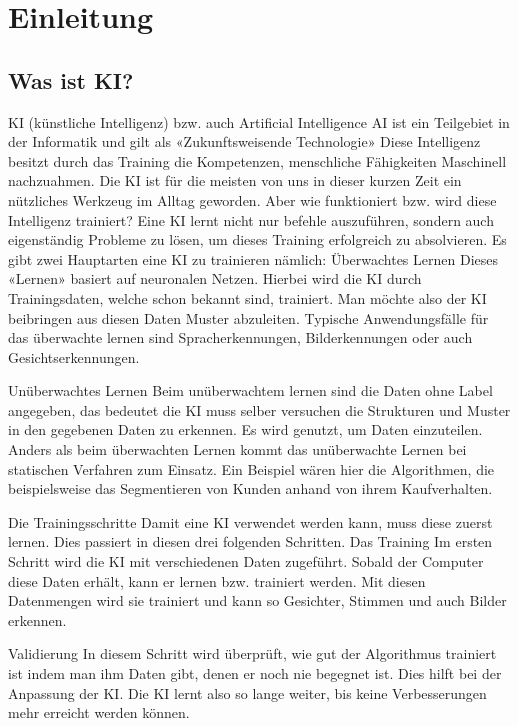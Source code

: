 \documentclass{report}
\begin{document}
\tableofcontents

\chapter{Einleitung}
\section{Was ist KI?}

KI (künstliche Intelligenz) bzw. auch Artificial Intelligence AI ist ein Teilgebiet in der Informatik und gilt als «Zukunftsweisende Technologie» Diese Intelligenz besitzt durch das Training die Kompetenzen, menschliche Fähigkeiten Maschinell nachzuahmen. Die KI ist für die meisten von uns in dieser kurzen Zeit ein nützliches Werkzeug im Alltag geworden. Aber wie funktioniert bzw. wird diese Intelligenz trainiert? 
Eine KI lernt nicht nur befehle auszuführen, sondern auch eigenständig Probleme zu lösen, um dieses Training erfolgreich zu absolvieren.
Es gibt zwei Hauptarten eine KI zu trainieren nämlich:  
Überwachtes Lernen
Dieses «Lernen» basiert auf neuronalen Netzen. Hierbei wird die KI durch Trainingsdaten, welche schon bekannt sind, trainiert. Man möchte also der KI beibringen aus diesen Daten Muster abzuleiten.
Typische Anwendungsfälle für das überwachte lernen sind Spracherkennungen, Bilderkennungen oder auch Gesichtserkennungen.

Unüberwachtes Lernen
Beim unüberwachtem lernen sind die Daten ohne Label angegeben, das bedeutet die KI muss selber versuchen die Strukturen und Muster in den gegebenen Daten zu erkennen. 
Es wird genutzt, um Daten einzuteilen. Anders als beim überwachten Lernen kommt das unüberwachte Lernen bei statischen Verfahren zum Einsatz. 
Ein Beispiel wären hier die Algorithmen, die beispielsweise das Segmentieren von Kunden anhand von ihrem Kaufverhalten. 

Die Trainingsschritte
Damit eine KI verwendet werden kann, muss diese zuerst lernen. Dies passiert in diesen drei folgenden Schritten.
Das Training
Im ersten Schritt wird die KI mit verschiedenen Daten zugeführt. Sobald der Computer diese Daten erhält, kann er lernen bzw. trainiert werden. Mit diesen Datenmengen wird sie trainiert und kann so Gesichter, Stimmen und auch Bilder erkennen.

Validierung 
In diesem Schritt wird überprüft, wie gut der Algorithmus trainiert ist indem man ihm Daten gibt, denen er noch nie begegnet ist. Dies hilft bei der Anpassung der KI. 
Die KI lernt also so lange weiter, bis keine Verbesserungen mehr erreicht werden können. 
\end{document}
